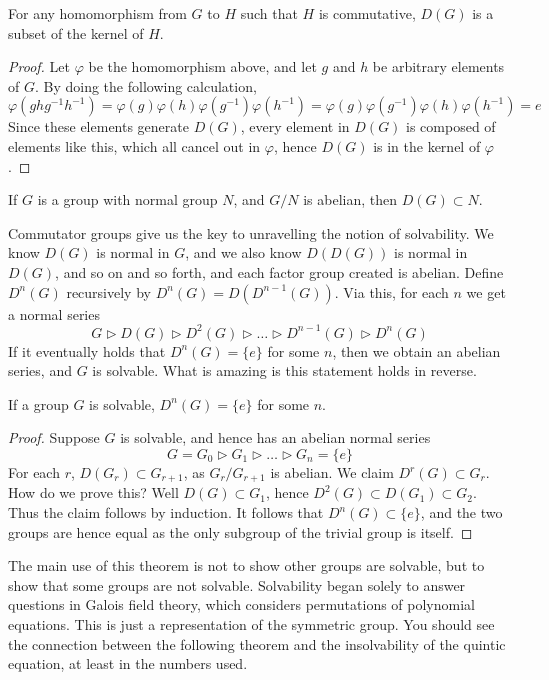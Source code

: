 \begin{lemma}
    For any homomorphism from $G$ to $H$ such that $H$ is commutative, $D(G)$ is a subset of the kernel of $H$.
\end{lemma}
\begin{proof}
    Let $\varphi$ be the homomorphism above, and let $g$ and $h$ be arbitrary elements of $G$. By doing the following calculation,
    \[ \varphi(ghg^{-1}h^{-1}) = \varphi(g)\varphi(h)\varphi(g^{-1})\varphi(h^{-1}) = \varphi(g)\varphi(g^{-1})\varphi(h)\varphi(h^{-1}) = e \]
    Since these elements generate $D(G)$, every element in $D(G)$ is composed of elements like this, which all cancel out in $\varphi$, hence $D(G)$ is in the kernel of $\varphi$.
\end{proof}

\begin{corollary}
    If $G$ is a group with normal group $N$, and $G/N$ is abelian, then $D(G) \subset N$.
\end{corollary}

Commutator groups give us the key to unravelling the notion of solvability. We know $D(G)$ is normal in $G$, and we also know $D(D(G))$ is normal in $D(G)$, and so on and so forth, and each factor group created is abelian. Define $D^n(G)$ recursively by $D^n(G) = D(D^{n-1}(G))$. Via this, for each $n$ we get a normal series
%
\[ G \rhd D(G) \rhd D^2(G) \rhd \dots \rhd D^{n-1}(G) \rhd D^n(G) \]
%
If it eventually holds that $D^n(G) = \{e\}$ for some $n$, then we obtain an abelian series, and $G$ is solvable. What is amazing is this statement holds in reverse.

\begin{theorem}
    If a group $G$ is solvable, $D^n(G) = \{e\}$ for some $n$.
\end{theorem}
\begin{proof}
    Suppose $G$ is solvable, and hence has an abelian normal series
    \[ G = G_0 \rhd G_1 \rhd \dots \rhd G_n = \{e\} \]
    For each $r$, $D(G_r) \subset G_{r+1}$, as $G_r/G_{r+1}$ is abelian. We claim $D^r(G) \subset G_r$. How do we prove this? Well $D(G) \subset G_1$, hence $D^2(G) \subset D(G_1) \subset G_2$. Thus the claim follows by induction. It follows that $D^n(G) \subset \{e\}$, and the two groups are hence equal as the only subgroup of the trivial group is itself.
\end{proof}

The main use of this theorem is not to show other groups are solvable, but to show that some groups are not solvable. Solvability began solely to answer questions in Galois field theory, which considers permutations of polynomial equations. This is just a representation of the symmetric group. You should see the connection between the following theorem and the insolvability of the quintic equation, at least in the numbers used.


